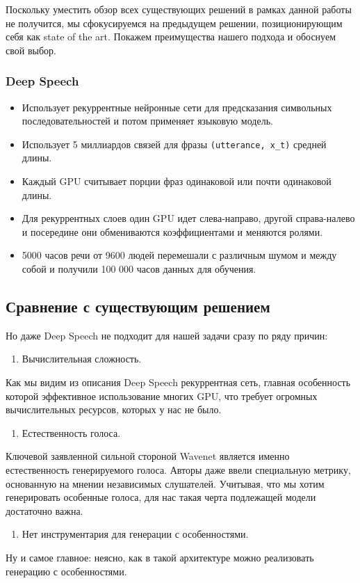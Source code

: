 \documentclass[../diploma.tex]{subfiles}
\begin{document}
Поскольку уместить обзор всех существующих решений в рамках данной работы не получится, мы сфокусируемся на предыдущем решении, позиционирующим себя как state of the art. Покажем преимущества нашего подхода и обоснуем свой выбор.

\subsubsection{Deep Speech}

\begin{itemize}
    \item Использует рекуррентные нейронные сети для предсказания символьных последовательностей и потом применяет языковую модель.
    \item Использует 5 миллиардов связей для фразы \verb|(utterance, x_t)| средней длины.
    \item Каждый GPU считывает порции фраз одинаковой или почти одинаковой длины.
    \item Для рекуррентных слоев один GPU идет слева-направо, другой справа-налево и посередине они обмениваются коэффициентами и меняются ролями.
    \item 5000 часов речи от 9600 людей перемешали с различным шумом и между собой и получили 100 000 часов данных для обучения.
\end{itemize}
\cite{article:hannun2014deep}


\subsection{Сравнение с существующим решением}

Но даже Deep Speech не подходит для нашей задачи сразу по ряду причин:
\begin{enumerate}
    \item Вычислительная сложность.
\end{enumerate}

Как мы видим из описания Deep Speech рекуррентная сеть, главная особенность которой эффективное использование многих GPU, что требует огромных вычислительных ресурсов, которых у нас не было. 
\begin{enumerate}[resume]
    \item Естественность голоса.
\end{enumerate}
Ключевой заявленной сильной стороной Wavenet является именно естественность генерируемого голоса. Авторы даже ввели специальную метрику, основанную на мнении независимых слушателей. Учитывая, что мы хотим генерировать особенные голоса, для нас такая черта подлежащей модели достаточно важна.

\begin{enumerate}[resume]
    \item Нет инструментария для генерации с особенностями.
\end{enumerate}
Ну и самое главное: неясно, как в такой архитектуре можно реализовать генерацию с особенностями. 
\end{document}
